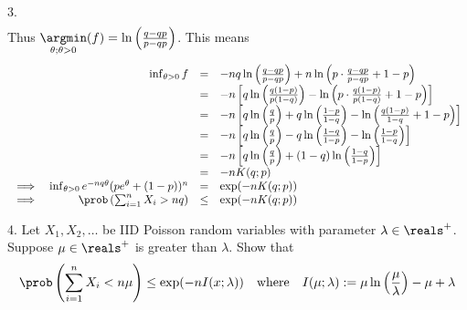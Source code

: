 \documentclass[11pt,a4paper]{article}
\begin{document}
\begin{answer}{3.}
\[\begin{array}{rrcl}
  \end{array}\]
  Thus $\underset{\theta;\theta>0}\argmin (f)=\ln\left(\frac{q-qp}{p-qp}\right)$. This means
  \[\begin{array}{rrcl}
    &\inf_{\theta>0}f&=&-nq\ln\left(\frac{q-qp}{p-qp}\right)+n\ln\left(p\cdot\frac{q-qp}{p-qp}+1-p\right)\\
    &&=&-n\left[q\ln\left(\frac{q(1-p)}{p(1-q)}\right)-\ln\left(p\cdot\frac{q(1-p)}{p(1-q)}+1-p\right)\right]\\
    &&=&-n\left[q\ln\left(\frac{q}p\right)+q\ln\left(\frac{1-p}{1-q}\right)-\ln\left(\frac{q(1-p)}{1-q}+1-p\right)\right]\\
    &&=&-n\left[q\ln\left(\frac{q}p\right)-q\ln\left(\frac{1-q}{1-p}\right)-\ln\left(\frac{1-p}{1-q}\right)\right]\\
    &&=&-n\left[q\ln\left(\frac{q}p\right)+(1-q)\ln\left(\frac{1-q}{1-p}\right)\right]\\
    &&=&-nK(q;p)\\
    \implies&\inf_{\theta>0}e^{-nq\theta}(pe^\theta+(1-p))^n&=&\exp(-nK(q;p))\\
    \implies&\prob\left(\sum_{i=1}^nX_i>nq\right)&\leq&\exp(-nK(q;p))
  \end{array}\]
\end{answer}

\begin{question}{4.}
  Let $X_1,X_2,\dots$ be IID Poisson random variables with parameter $\lambda\in\reals^+$. Suppose $\mu\in\reals^+$ is greater than $\lambda$. Show that
  \[ \prob\left(\sum_{i=1}^nX_i<n\mu\right)\leq\exp(-nI(x;\lambda))\quad\text{where}\quad I(\mu;\lambda):=\mu\ln\left(\frac\mu\lambda\right)-\mu+\lambda \]
\end{question}
\end{document}
